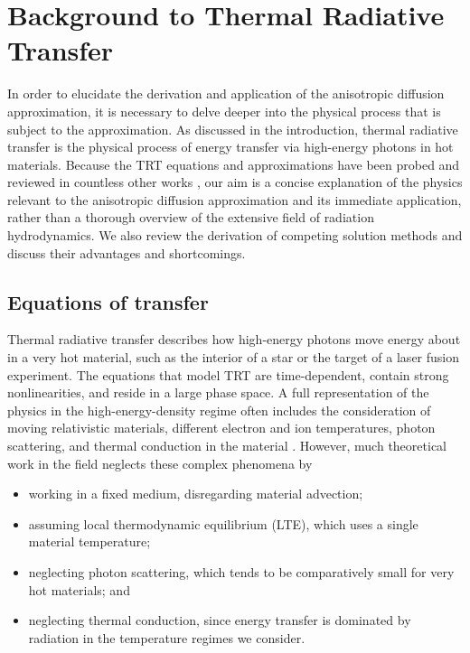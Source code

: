 
\chapter{Background to Thermal Radiative Transfer}\label{chap:trtBackground}

In order to elucidate the derivation and application of the anisotropic
diffusion approximation, it is necessary to delve deeper into the physical
process that is subject to the approximation. As discussed in the introduction,
thermal radiative transfer is the physical process of energy transfer via
high-energy photons in hot materials. Because the TRT equations and
approximations have been probed and reviewed in countless other works
\cite{Mih1984,Pom1973,Cas2004,Wol2008}, our aim is a concise explanation of the
physics relevant to the anisotropic diffusion approximation and its immediate
application, rather than a thorough overview of the extensive field of radiation
hydrodynamics. We also review the derivation of competing solution methods and
discuss their advantages and shortcomings.

\section{Equations of transfer}\label{sec:trtEquations}
Thermal radiative transfer describes how high-energy photons move energy about
in a very hot material, such as the interior of a star or the target of a laser
fusion experiment. The equations that model TRT are time-dependent, contain
strong nonlinearities, and reside in a large phase space.
A full representation of the physics in
the high-energy-density regime often includes the consideration of moving
relativistic materials, different electron and ion temperatures, photon
scattering, and thermal conduction in the material \cite{Mih1984}. However,
much theoretical work in the field neglects these complex phenomena by
\begin{itemize}
  \item working in a fixed medium, disregarding material advection;
  \item assuming local thermodynamic equilibrium (LTE), which uses a single
    material temperature;
  \item neglecting photon scattering, which tends to be comparatively small for
    very hot materials; and
  \item neglecting thermal conduction, since energy transfer is dominated by
    radiation in the temperature regimes we consider.
\end{itemize}

